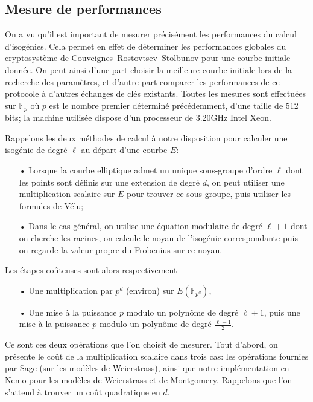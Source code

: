 \documentclass[11pt,a4paper]{article}
\newcommand{\F}{\mathbb{F}}
\theoremstyle{definition}
\begin{document}
\subsection{Mesure de performances}

On a vu qu'il est important de mesurer précisément les performances du calcul d'isogénies. Cela permet en effet de déterminer les performances globales du cryptosystème de Couveignes--Rostovtsev--Stolbunov pour une courbe initiale donnée. On peut ainsi d'une part choisir la meilleure courbe initiale lors de la recherche des paramètres, et d'autre part comparer les performances de ce protocole à d'autres échanges de clés existants. Toutes les mesures sont effectuées sur $\F_p$ où $p$ est le nombre premier déterminé précédemment, d'une taille de 512 bits; la machine utilisée dispose d'un processeur de 3.20GHz Intel Xeon.

Rappelons les deux méthodes de calcul à notre disposition pour calculer une isogénie de degré $\ell$ au départ d'une courbe $E$:
\begin{itemize}
\item[•] Lorsque la courbe elliptique admet un unique sous-groupe d'ordre $\ell$ dont les points sont définis sur une extension de degré $d$, on peut utiliser une multiplication scalaire sur $E$ pour trouver ce sous-groupe, puis utiliser les formules de Vélu;
\item[•] Dans le cas général, on utilise une équation modulaire de degré $\ell + 1$ dont on cherche les racines, on calcule le noyau de l'isogénie correspondante puis on regarde la valeur propre du Frobenius sur ce noyau.
\end{itemize}
Les étapes coûteuses sont alors respectivement
\begin{itemize}
\item[•] Une multiplication par $p^d$ (environ) sur $E(\F_{p^d})$,
\item[•] Une mise à la puissance $p$ modulo un polynôme de degré $\ell + 1$, puis une mise à la puissance $p$ modulo un polynôme de degré $\frac{\ell - 1}{2}$.
\end{itemize}
Ce sont ces deux opérations que l'on choisit de mesurer. Tout d'abord, on présente le coût de la multiplication scalaire dans trois cas: les opérations fournies par Sage (sur les modèles de Weierstrass), ainsi que notre implémentation en Nemo pour les modèles de Weierstrass et de Montgomery. Rappelons que l'on s'attend à trouver un coût quadratique en $d$.
\end{document}
